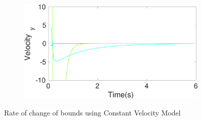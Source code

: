 \begin{figure}[h]
\begin{subfigure}{.5\linewidth}
\end{subfigure}
\begin{subfigure}{.5\linewidth}
\centering
\includegraphics[width=\linewidth]{figures/BoundChange/CV/cv_bound_changeVelocity_y}
\end{subfigure}
\caption{Rate of change of bounds using Constant Velocity Model}
\end{figure}


